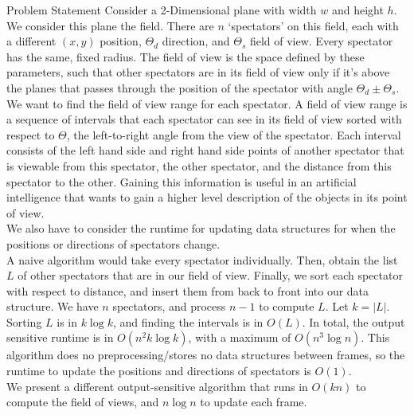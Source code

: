 \documentclass[11pt]{article}
\begin{document}
\begin{section}{Problem Statement}
Consider a 2-Dimensional plane with width $w$ and height $h$. We consider this plane the field. There are $n$ `spectators' on this field, each with a different $(x, y)$ position, $\Theta_d$ direction, and $\Theta_s$ field of view. Every spectator has the same, fixed radius. The field of view is the space defined by these parameters, such that other spectators are in its field of view only if it's above the planes that passes through the position of the spectator with angle $\Theta_d \pm \Theta_s$. \\

We want to find the field of view range for each spectator. A field of view range is a sequence of intervals that each spectator can see in its field of view sorted with respect to $\Theta$, the left-to-right angle from the view of the spectator. Each interval consists of the left hand side and right hand side points of another spectator that is viewable from this spectator, the other spectator, and the distance from this spectator to the other. Gaining this information is useful in an artificial intelligence that wants to gain a higher level description of the objects in its point of view.\\

We also have to consider the runtime for updating data structures for when the positions or directions of spectators change.\\

A naive algorithm would take every spectator individually. Then, obtain the list $L$ of other spectators that are in our field of view. Finally, we sort each spectator with respect to distance, and insert them from back to front into our data structure. We have $n$ spectators, and process $n-1$ to compute $L$. Let $k = |L|$. Sorting $L$ is in $k\log k$, and finding the intervals is in $O(L)$. In total, the output sensitive runtime is in $O(n^2k\log k)$, with a maximum of $O(n^3\log n)$. This algorithm does no preprocessing/stores no data structures between frames, so the runtime to update the positions and directions of spectators is $O(1)$.\\

We present a different output-sensitive algorithm that runs in $O(k n)$ to compute the field of views, and $n\log n$ to update each frame.\\
\end{section}
\end{document}
